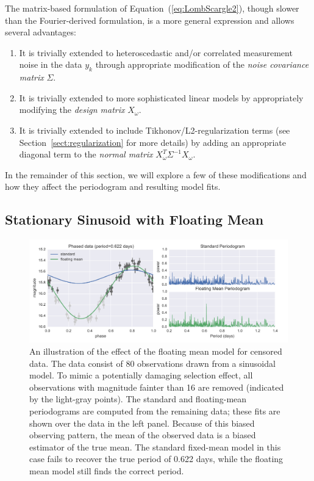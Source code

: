 \documentclass{emulateapj}
\newcommand{\figlabel}[1]{\label{fig:#1}}
\newcommand{\Eq}[1]{Equation~(\ref{eq:#1})}
\newcommand{\eq}[1]{\Eq{#1}}
\newcommand{\Sect}[1]{Section~\ref{sect:#1}}
\newcommand{\sect}[1]{\Sect{#1}}
\newcommand{\sectlabel}[1]{\label{sect:#1}}
\begin{document}
The matrix-based formulation of \eq{LombScargle2}, though slower than the Fourier-derived formulation, is a more general expression and allows several advantages:
\begin{enumerate}
  \item It is trivially extended to heteroscedastic and/or correlated measurement noise in the data $y_k$ through appropriate modification of the {\it noise covariance matrix} $\Sigma$.
  \item It is trivially extended to more sophisticated linear models by appropriately modifying the {\it design matrix} $X_\omega$.
  \item It is trivially extended to include Tikhonov/L2-regularization terms (see \sect{regularization} for more details)  by adding an appropriate diagonal term to the {\it normal matrix} $X_\omega^T\Sigma^{-1}X_\omega$.
\end{enumerate}
In the remainder of this section, we will explore a few of these modifications and how they affect the periodogram and resulting model fits.


\subsection{Stationary Sinusoid with Floating Mean}
\sectlabel{floating_mean}

\begin{figure}
  \centering
  \includegraphics[width=\textwidth]{fig02.pdf}
  \caption{
    An illustration of the effect of the floating mean model for censored data.
    The data consist of 80 observations drawn from a sinusoidal model. To mimic a potentially damaging selection effect, all observations with magnitude fainter than 16 are removed (indicated by the light-gray points). The standard and floating-mean periodograms are computed from the remaining data; these fits are shown over the data in the left panel. Because of this biased observing pattern, the mean of the observed data is a biased estimator of the true mean. The standard fixed-mean model in this case fails to recover the true period of 0.622 days, while the floating mean model still finds the correct period.
  }
  \figlabel{floating_mean}
\end{figure}
\end{document}
